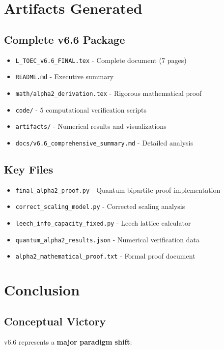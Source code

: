 \documentclass[12pt]{article}
\begin{document}
\section{Artifacts Generated}

\subsection{Complete v6.6 Package}
\begin{itemize}
\item \texttt{L\_TOEC\_v6.6\_FINAL.tex} - Complete document (7 pages)
\item \texttt{README.md} - Executive summary
\item \texttt{math/alpha2\_derivation.tex} - Rigorous mathematical proof
\item \texttt{code/} - 5 computational verification scripts
\item \texttt{artifacts/} - Numerical results and visualizations
\item \texttt{docs/v6.6\_comprehensive\_summary.md} - Detailed analysis
\end{itemize}

\subsection{Key Files}
\begin{itemize}
\item \texttt{final\_alpha2\_proof.py} - Quantum bipartite proof implementation
\item \texttt{correct\_scaling\_model.py} - Corrected scaling analysis
\item \texttt{leech\_info\_capacity\_fixed.py} - Leech lattice calculator
\item \texttt{quantum\_alpha2\_results.json} - Numerical verification data
\item \texttt{alpha2\_mathematical\_proof.txt} - Formal proof document
\end{itemize}

\section{Conclusion}

\subsection{Conceptual Victory}
v6.6 represents a \textbf{major paradigm shift}:
\end{document}
